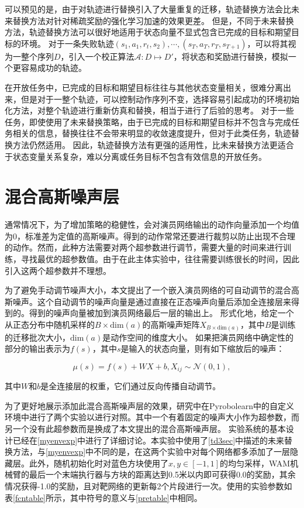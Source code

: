         可以预见的是，由于对轨迹进行替换引入了大量重复的迁移，轨迹替换方法会比未来替换方法对针对稀疏奖励的强化学习加速的效果更差。
        但是，不同于未来替换方法，轨迹替换方法可以很好地适用于状态向量不显式包含已完成的目标和期望目标的环境。
        对于一条失败轨迹$(s_1,a_1,r_t,s_2),\cdots,(s_T,a_T,r_T,s_{T+1})$，可以将其视为一整个序列$D$，引入一个校正算法$\mathcal A:D\mapsto D'$，将状态和奖励进行替换，模拟一个更容易成功的轨迹。

        在开放任务中，已完成的目标和期望目标往往与其他状态变量相关，很难分离出来，但是对于一整个轨迹，可以控制动作序列不变，选择容易引起成功的环境初始化方法，对整个轨迹进行重新仿真和替换，相当于进行了后验的思考。
        对于一些任务，即使使用了未来替换策略，由于已完成的目标和期望目标并不包含与完成任务相关的信息，替换往往不会带来明显的收敛速度提升，但对于此类任务，轨迹替换方法仍然适用。
        因此，轨迹替换方法有更强的适用性，比未来替换方法更适合于状态变量关系复杂，难以分离或任务目标不包含有效信息的开放任务。


\section{混合高斯噪声层}

通常情况下，为了增加策略的稳健性，会对演员网络输出的动作向量添加一个均值为0，标准差为定值的高斯噪声。得到的动作常常还要进行裁剪以防止出现不合理的动作。然而，此种方法需要对两个超参数进行调节，需要大量的时间来进行训练，寻找最优的超参数值。由于在此主体实验中，往往需要训练很长的时间，因此引入这两个超参数并不理想。
    
为了避免手动调节噪声大小，本文提出了一个嵌入演员网络的可自动调节的混合高斯噪声。这个自动调节的噪声向量是通过直接在正态噪声向量后添加全连接层来得到的。得到的噪声向量被加到演员网络最后一层的输出上。
形式化地，给定一个从正态分布中随机采样的$B\times \mathrm{dim}(a)$的高斯噪声矩阵$X_{B\times \mathrm{dim}(a)}$，其中$B$是训练的迁移批次大小，$\mathrm{dim}(a)$是动作空间的维度大小。
如果把演员网络中确定性的部分的输出表示为$f(s)$，其中$s$是输入的状态向量，则有如下缩放后的噪声：

    $$ \mu(s) = f(s) + W X + b, X_{ij}\sim\mathcal N(0,1),$$

    其中$W$和$b$是全连接层的权重，它们通过反向传播自动调节。

    为了更好地展示添加此混合高斯噪声层的效果，研究中在Pyrobolearn中的自定义环境中进行了两个实验以进行对照。其中一个有着固定的噪声大小作为超参数，而另一个没有此超参数而是换成了本文提出的混合高斯噪声层。
    实验系统的基本设计已经在\ref{myenvexp}中进行了详细讨论。本实验中使用了\ref{td3sec}中描述的未来替换方法，与\ref{myenvexp}中不同的是，在这两个实验中对每个网络都多添加了一层隐藏层。此外，随机初始化时对蓝色方块使用了$x,y\in[-1,1]$的均匀采样，WAM机械臂的最后一个末端执行器与方块的距离达到0.5米以内即可获得0.0的奖励，其余情况获得-1.0的奖励，且对靶网络的更新每2个片段进行一次。使用的实验参数如表\ref{fcntable}所示，其中符号的意义与\ref{pretable}中相同。

